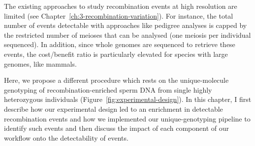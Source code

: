 \newpage

\begin{mccorrection}

The existing approaches to study recombination events at high resolution are limited (see Chapter~\ref{ch:3-recombination-variation}).
For instance, the total number of events detectable with approaches like pedigree analyses is capped by the restricted number of meioses that can be analysed (one meiosis per individual sequenced).
In addition, since whole genomes are sequenced to retrieve these events, the cost/benefit ratio is particularly elevated for species with large genomes, like mammals.

%

\end{mccorrection}

Here, we propose a different procedure which rests on the unique-molecule genotyping of recombination-enriched sperm DNA from single highly heterozygous individuals (Figure~\ref{fig:experimental-design}).
In this chapter, I first describe how our experimental design led to an enrichment in detectable recombination events and how we implemented our unique-genotyping pipeline to identify such events and then discuss the impact of each component of our workflow onto the detectability of events.

